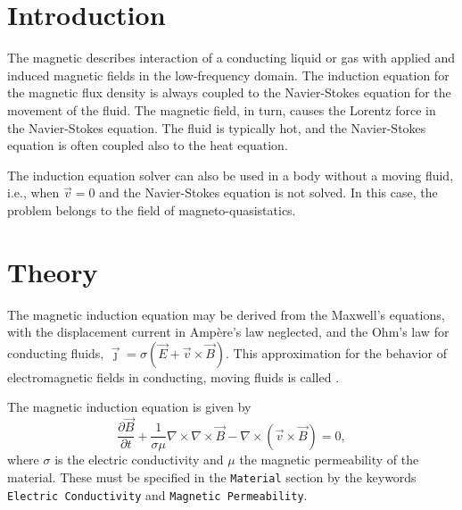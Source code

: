 \noindent
{}
\begin{versiona}

\section{Introduction}

The magnetic  describes interaction of a conducting
liquid or gas with applied and induced magnetic fields in the low-frequency
domain. The induction equation for the magnetic flux density is always coupled
to the Navier-Stokes equation for the movement of the fluid. The magnetic
field, in turn, causes the Lorentz force in the Navier-Stokes equation. The
fluid is typically hot, and the Navier-Stokes equation is often coupled also
to the heat equation.

The induction equation solver can also be used in a body without a moving
fluid, i.e., when $\vec{v}=0$ and the Navier-Stokes equation is not solved.
In this case, the problem belongs to the field of magneto-quasistatics.

\section{Theory}

The magnetic induction equation may be derived from the Maxwell's equations,
with the displacement current in Amp\`{e}re's law neglected, and the Ohm's law
for conducting fluids,
$\vec{\jmath} = \sigma ( \vec{E} + \vec{v}\times\vec{B} )$. This approximation
for the behavior of electromagnetic
fields in conducting, moving fluids is called .

The magnetic induction equation is given by
\begin{equation}
\frac{\partial \vec{B}}{\partial t} + \frac{1}{\sigma\mu}\nabla\times\nabla\times \vec{B} - 
\nabla\times(\vec{v}\times \vec{B}) = 0,\label{induction}
\end{equation}
where $\sigma$ is the electric conductivity and
$\mu$ the magnetic permeability of the material. These must be specified in the
{\tt Material} section by the
keywords {\tt Electric Conductivity} and {\tt Magnetic Permeability}.


\end{versiona}
